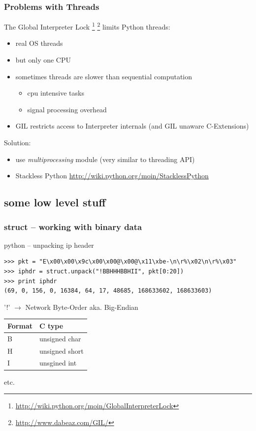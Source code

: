 \documentclass{beamer}
\begin{document}
\begin{frame}[fragile]
	\frametitle{Problems with Threads}
	The Global Interpreter Lock \footnote{\scriptsize{\url{http://wiki.python.org/moin/GlobalInterpreterLock}}}
	\footnote{\scriptsize{\url{http://www.dabeaz.com/GIL/}}} limits Python threads:
	\begin{itemize}
		\item real OS threads
		\item but only one CPU
		\item sometimes threads are slower than sequential computation
		\begin{itemize}
			\item cpu intensive tasks
			\item signal processing overhead
		\end{itemize}
		\item GIL restricts access to Interpreter internals (and GIL unaware C-Extensions)
	\end{itemize}
	
	Solution:
	\begin{itemize}
	\item use \emph{multiprocessing} module (very similar to threading API)
	\item Stackless Python \scriptsize{\url{http://wiki.python.org/moin/StacklessPython}}
	\end{itemize}
\end{frame}

\subsection*{some low level stuff}	%

\begin{frame}[fragile]
	\frametitle{struct -- working with binary data}
	\begin{exampleblock}{python -- unpacking ip header}
	\begin{lstlisting}
>>> pkt = "E\x00\x00\x9c\x00\x00@\x00@\x11\xbe-\n\r%\x02\n\r%\x03"
>>> iphdr = struct.unpack("!BBHHHBBHII", pkt[0:20])
>>> print iphdr
(69, 0, 156, 0, 16384, 64, 17, 48685, 168633602, 168633603)
	\end{lstlisting}
	\end{exampleblock}
	'!' $\rightarrow$ Network Byte-Order aka. Big-Endian\\[0.4cm]
	\begin{tabular}{|l|l|}	
	Format & C type\\
	\hline
	B & unsigned char\\
	H & unsigned short\\
	I & unsgined int\\	
	\end{tabular}
	
	
	etc.
\end{frame}
\end{document}

